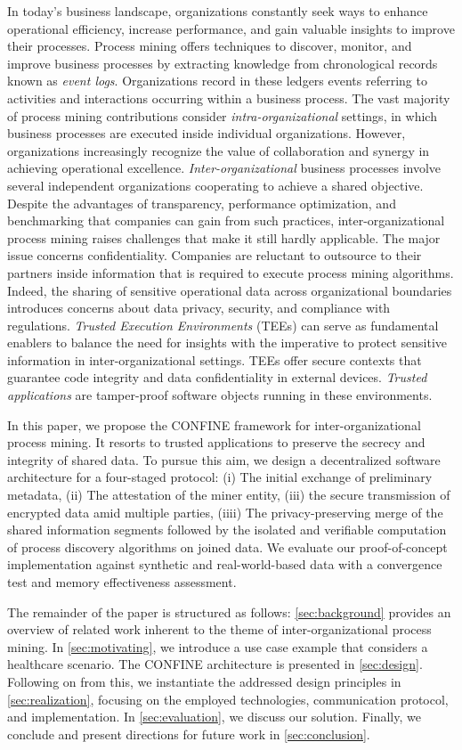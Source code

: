 In today's business landscape, organizations constantly seek ways to enhance operational efficiency, increase performance, and gain valuable insights to improve their processes. Process mining offers techniques to discover, monitor, and improve business processes by extracting knowledge from chronological records known as \textit{event logs}. Organizations record in these ledgers events referring to activities and interactions occurring within a business process. The vast majority of process mining contributions consider \textit{intra-organizational} settings, in which business processes are executed inside individual organizations. However, organizations increasingly recognize the value of collaboration and synergy in achieving operational excellence. \textit{Inter-organizational} business processes involve several independent organizations cooperating to achieve a shared objective. Despite the advantages of transparency, performance optimization, and benchmarking that companies can gain from such practices, inter-organizational process mining raises challenges that make it still hardly applicable. The major issue concerns confidentiality. Companies are reluctant to outsource to their partners inside information that is required to execute process mining algorithms. Indeed, the sharing of sensitive operational data across organizational boundaries introduces concerns about data privacy, security, and compliance with regulations. \textit{Trusted Execution Environments} (TEEs) can serve as fundamental enablers to balance the need for insights with the imperative to protect sensitive information in inter-organizational settings. TEEs offer secure contexts that guarantee code integrity and data confidentiality in external devices. \textit{Trusted applications} are tamper-proof software objects running in these environments. 

In this paper, we propose the CONFINE framework for inter-organizational process mining. It resorts to trusted applications to preserve the secrecy and integrity of shared data. To pursue this aim, we design a decentralized software architecture for a four-staged protocol: (i) The initial exchange of preliminary metadata, (ii) The attestation of the miner entity, (iii) the secure transmission of encrypted data amid multiple parties, (iiii) The privacy-preserving merge of the shared information segments followed by the isolated and verifiable computation of process discovery algorithms on joined data.
We evaluate our proof-of-concept implementation against synthetic and real-world-based data with a convergence test and memory effectiveness assessment.

The remainder of the paper is structured as follows: \cref{sec:background} provides an overview of related work inherent to the theme of inter-organizational process mining. In \cref{sec:motivating}, we introduce a use case example that considers a healthcare scenario. The CONFINE architecture is presented in \cref{sec:design}. Following on from this, we instantiate the addressed design principles in \cref{sec:realization}, focusing on the employed technologies, communication protocol, and implementation. In \cref{sec:evaluation}, we discuss our solution. Finally, we conclude and present directions for future work in \cref{sec:conclusion}.
